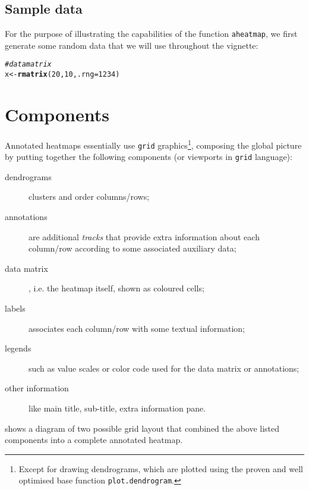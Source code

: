 \documentclass[a4paper]{article}\usepackage[]{graphicx}\usepackage[]{color}
\makeatletter
\newcommand{\hlnum}[1]{\textcolor[rgb]{0.686,0.059,0.569}{#1}}%
\newcommand{\hlcom}[1]{\textcolor[rgb]{0.678,0.584,0.686}{\textit{#1}}}%
\newcommand{\hlstd}[1]{\textcolor[rgb]{0.345,0.345,0.345}{#1}}%
\newcommand{\hlkwb}[1]{\textcolor[rgb]{0.69,0.353,0.396}{#1}}%
\newcommand{\hlkwc}[1]{\textcolor[rgb]{0.333,0.667,0.333}{#1}}%
\newcommand{\hlkwd}[1]{\textcolor[rgb]{0.737,0.353,0.396}{\textbf{#1}}}%
\newenvironment{kframe}{%
 \def\at@end@of@kframe{}%
 \ifinner\ifhmode%
  \def\at@end@of@kframe{\end{minipage}}%
  \begin{minipage}{\columnwidth}%
 \fi\fi%
 \def\FrameCommand##1{\hskip\@totalleftmargin \hskip-\fboxsep
 \colorbox{shadecolor}{##1}\hskip-\fboxsep
     \hskip-\linewidth \hskip-\@totalleftmargin \hskip\columnwidth}%
 \MakeFramed {\advance\hsize-\width
   \@totalleftmargin\z@ \linewidth\hsize
   \@setminipage}}%
 {\par\unskip\endMakeFramed%
 \at@end@of@kframe}
\newenvironment{knitrout}{}{} %
\let\code=\texttt
\makeatother
\begin{document}
\subsection{Sample data}
For the purpose of illustrating the capabilities of the function
\code{aheatmap}, we first generate some random data that we will use throughout
the vignette:

\begin{knitrout}\small
{}\color{fgcolor}\begin{kframe}
\begin{alltt}
\hlcom{# data matrix}
\hlstd{x} \hlkwb{<-} \hlkwd{rmatrix}\hlstd{(}\hlnum{20}\hlstd{,} \hlnum{10}\hlstd{,} \hlkwc{.rng} \hlstd{=} \hlnum{1234}\hlstd{)}
\end{alltt}
\end{kframe}
\end{knitrout}

\section{Components}

Annotated heatmaps essentially use \code{grid} graphics\footnote{Except for
drawing dendrograms, which are plotted using the proven and well optimised base
function \code{plot.dendrogram}.}, composing the global picture by putting
together the following components (or viewports in \code{grid} language):

\begin{description}
  \item[dendrograms] clusters and order columns/rows; 
  \item[annotations] are additional \emph{tracks} that provide extra
  information about each column/row according to some associated auxiliary data;
  \item[data matrix], i.e. the heatmap itself, shown as coloured cells;
  \item[labels] associates each column/row with some textual information;
  \item[legends] such as value scales or color code used for the data matrix or
  annotations;
  \item[other information] like main title, sub-title, extra information pane.
\end{description}

 shows a diagram of two possible grid layout that combined
the above listed components into a complete annotated heatmap.
\end{document}
